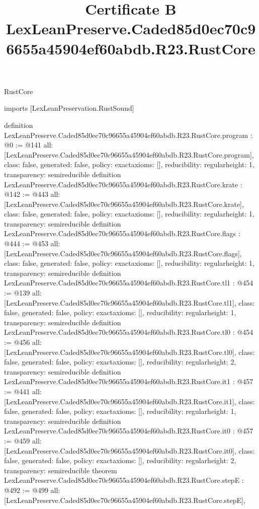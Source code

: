 \begin{lexlean}{RustCore}
\title{Certificate B LexLeanPreserve.Caded85d0ec70c96655a45904ef60abdb.R23.RustCore}
\begin{coremodule}
imports [LexLeanPreservation.RustSound]

definition LexLeanPreserve.Caded85d0ec70c96655a45904ef60abdb.R23.RustCore.program : @0 := @141 {
  all: [LexLeanPreserve.Caded85d0ec70c96655a45904ef60abdb.R23.RustCore.program],
  class: false,
  generated: false,
  policy: exact{axioms: []},
  reducibility: regular{height: 1},
  transparency: semireducible
}
definition LexLeanPreserve.Caded85d0ec70c96655a45904ef60abdb.R23.RustCore.krate : @142 := @443 {
  all: [LexLeanPreserve.Caded85d0ec70c96655a45904ef60abdb.R23.RustCore.krate],
  class: false,
  generated: false,
  policy: exact{axioms: []},
  reducibility: regular{height: 1},
  transparency: semireducible
}
definition LexLeanPreserve.Caded85d0ec70c96655a45904ef60abdb.R23.RustCore.flags : @444 := @453 {
  all: [LexLeanPreserve.Caded85d0ec70c96655a45904ef60abdb.R23.RustCore.flags],
  class: false,
  generated: false,
  policy: exact{axioms: []},
  reducibility: regular{height: 1},
  transparency: semireducible
}
definition LexLeanPreserve.Caded85d0ec70c96655a45904ef60abdb.R23.RustCore.tl1 : @454 := @139 {
  all: [LexLeanPreserve.Caded85d0ec70c96655a45904ef60abdb.R23.RustCore.tl1],
  class: false,
  generated: false,
  policy: exact{axioms: []},
  reducibility: regular{height: 1},
  transparency: semireducible
}
definition LexLeanPreserve.Caded85d0ec70c96655a45904ef60abdb.R23.RustCore.tl0 : @454 := @456 {
  all: [LexLeanPreserve.Caded85d0ec70c96655a45904ef60abdb.R23.RustCore.tl0],
  class: false,
  generated: false,
  policy: exact{axioms: []},
  reducibility: regular{height: 2},
  transparency: semireducible
}
definition LexLeanPreserve.Caded85d0ec70c96655a45904ef60abdb.R23.RustCore.it1 : @457 := @441 {
  all: [LexLeanPreserve.Caded85d0ec70c96655a45904ef60abdb.R23.RustCore.it1],
  class: false,
  generated: false,
  policy: exact{axioms: []},
  reducibility: regular{height: 1},
  transparency: semireducible
}
definition LexLeanPreserve.Caded85d0ec70c96655a45904ef60abdb.R23.RustCore.it0 : @457 := @459 {
  all: [LexLeanPreserve.Caded85d0ec70c96655a45904ef60abdb.R23.RustCore.it0],
  class: false,
  generated: false,
  policy: exact{axioms: []},
  reducibility: regular{height: 2},
  transparency: semireducible
}
theorem LexLeanPreserve.Caded85d0ec70c96655a45904ef60abdb.R23.RustCore.stepE : @492 := @499 {
  all: [LexLeanPreserve.Caded85d0ec70c96655a45904ef60abdb.R23.RustCore.stepE],
}
\end{coremodule}
\end{lexlean}
